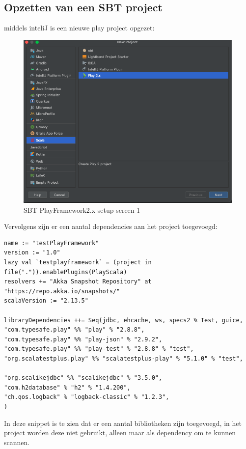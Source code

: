 \subsection{Opzetten van een SBT project}\label{subsec:opzetten-van-een-project}
middels inteliJ is een nieuwe play project opgezet:
\begin{figure}
    \centering
    \includegraphics{gfx/sbtplaysetup}
    \caption{SBT PlayFramework2.x setup screen 1}
    \label{fig:sbtplaysetupscreen1}
\end{figure}
Vervolgens zijn er een aantal dependencies aan het project toegevoegd:
\begin{lstlisting}[caption={build.sbt},label=lst:build.sbt]
name := "testPlayFramework"
version := "1.0"
lazy val `testplayframework` = (project in file(".")).enablePlugins(PlayScala)
resolvers += "Akka Snapshot Repository" at "https://repo.akka.io/snapshots/"
scalaVersion := "2.13.5"

libraryDependencies ++= Seq(jdbc, ehcache, ws, specs2 % Test, guice,
"com.typesafe.play" %% "play" % "2.8.8",
"com.typesafe.play" %% "play-json" % "2.9.2",
"com.typesafe.play" %% "play-test" % "2.8.8" % "test",
"org.scalatestplus.play" %% "scalatestplus-play" % "5.1.0" % "test",

"org.scalikejdbc" %% "scalikejdbc" % "3.5.0",
"com.h2database" % "h2" % "1.4.200",
"ch.qos.logback" % "logback-classic" % "1.2.3",
)

\end{lstlisting}
In deze snippet is te zien dat er een aantal bibliotheken zijn toegevoegd, in het project worden deze niet gebruikt, alleen maar als dependency om te kunnen scannen.



